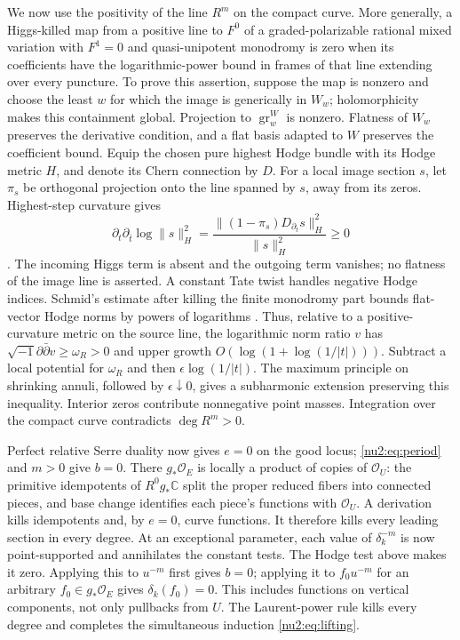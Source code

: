 We now use the positivity of the line $R^m$ on the compact curve.
More generally, a Higgs-killed map from a positive line to $F^0$ of a
graded-polarizable rational mixed variation with $F^1=0$ and
quasi-unipotent monodromy is zero when its coefficients have the
logarithmic-power bound in frames of that line extending over every
puncture.  To prove this assertion, suppose the map is nonzero and choose the least $w$ for which the image is generically
in $W_w$; holomorphicity makes this containment global.  Projection
to $\operatorname{gr}_w^W$ is nonzero.  Flatness of $W_w$ preserves
the derivative condition, and a flat basis adapted to $W$ preserves
the coefficient bound.  Equip the chosen pure highest Hodge bundle
with its Hodge metric $H$, and denote its Chern connection by $D$.
For a local image section $s$, let $\pi_s$ be orthogonal projection
onto the line spanned by $s$, away from its zeros.  Highest-step
curvature gives
\[
 \partial_t\partial_{\bar t}\log\|s\|_H^2
 =\frac{\|(1-\pi_s)D_{\partial_t}s\|_H^2}{\|s\|_H^2}\ge0
\]
\cite[Theorem~(5.2), Lemmas~(4.9),(4.13)]{Griffiths1970}.
The incoming Higgs term is absent and the outgoing term vanishes;
no flatness of the image line is asserted.  A constant Tate twist
handles negative Hodge indices.  Schmid's estimate after killing
the finite monodromy part bounds flat-vector Hodge norms by powers
of logarithms \cite[Theorem~(6.6$'$)]{Schmid1973}.
Thus, relative to a positive-curvature metric on the source line,
the logarithmic norm ratio $v$ has
$\sqrt{-1}\partial\bar\partial v\ge\omega_R>0$ and upper growth
$O(\log(1+\log(1/|t|)))$.
Subtract a local potential for $\omega_R$ and then
$\epsilon\log(1/|t|)$.  The maximum principle on shrinking annuli,
followed by $\epsilon\downarrow0$, gives a subharmonic extension
preserving this inequality.  Interior zeros contribute nonnegative
point masses.  Integration over the compact curve contradicts
$\deg R^m>0$.

Perfect relative Serre duality now gives $e=0$ on the good locus;
\eqref{nu2:eq:period} and $m>0$ give $b=0$.  There
$g_*\mathcal O_E$ is locally a product of copies of $\mathcal O_U$:
the primitive idempotents of $R^0g_*\mathbb C$ split the proper
reduced fibers into connected pieces, and base change identifies
each piece's functions with $\mathcal O_U$.  A derivation kills
idempotents and, by $e=0$, curve functions.  It therefore kills
every leading section in every degree.
At an exceptional parameter, each value of $\delta_k^{-m}$ is now
point-supported and annihilates the constant tests.  The Hodge test
above makes it zero.  Applying this to $u^{-m}$ first gives $b=0$;
applying it to $f_0u^{-m}$ for an arbitrary
$f_0\in g_*\mathcal O_E$ gives $\delta_k(f_0)=0$.
This includes functions on vertical components, not only pullbacks
from $U$.  The Laurent-power rule kills every degree and completes
the simultaneous induction \eqref{nu2:eq:lifting}.


